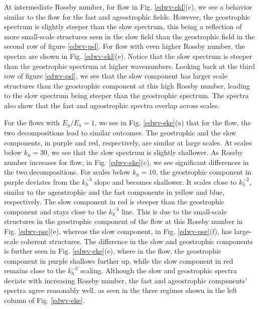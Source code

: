 \documentclass[../Rajarshi-thesis-draft.tex]{subfiles}
\begin{document}
At intermediate Rossby number, for \ire flow in Fig. \ref{edwv-ekl}(c), we see a behavior similar to the \lre flow for the fast and ageostrophic fields. However, the geostrophic spectrum is slightly steeper than the slow spectrum, this being a reflection of more small-scale structures seen in the slow field than the geostrophic field in the second row of figure \ref{edwv-psl}. 
For \hre flow with even higher Rossby number, the spectra are shown in Fig. \ref{edwv-ekl}(e). Notice that the slow spectrum is steeper than the geostrophic spectrum at higher wavenumbers. Looking back at the third row of figure \ref{edwv-psl}, we see that the slow component has larger scale structures than the geostrophic component at this high Rossby number, leading to the slow spectrum being steeper than the geostrophic spectrum.  The spectra also show that the fast and ageostrophic spectra overlap across scales. 

For the flows with $E_g/E_a = 1$, we see in Fig. \ref{edwv-eke}(a) that for the \lro flow, the two decompositions lead to similar outcomes. The geostrophic and the slow components, in purple and red, respectively, are similar at large scales.  At scales below  $k_h = 30$, we see that the slow spectrum is slightly shallower. As Rossby number increases for \iro flow, in Fig. \ref{edwv-eke}(c), we see significant differences in the two decompositions. For scales below  $k_h = 10$, the geostrophic component in purple deviates from the $k_h^{-3}$ slope and becomes shallower. It scales close to $k_h^{-2}$, similar to the ageostrophic and the fast components in yellow and blue, respectively. The slow component in red is steeper than the geostrophic component and stays close to the $k_h^{-3}$ line. This is due to the small-scale structures in the geostrophic component of the flow at this Rossby number in Fig. \ref{edwv-pse}(e), whereas the slow component, in Fig. \ref{edwv-pse}(f), has large-scale coherent structures. The difference in the slow and geostrophic components is further seen in Fig. \ref{edwv-eke}(e), where in the \hro flow, the geostrophic component in purple shallows further up, while the slow component in red remains close to the $k_h^{-3}$ scaling. Although the slow and geostrophic spectra deviate with increasing Rossby number, the fast and ageostrophic components' spectra agree reasonably well, as seen in the three regimes shown in the left column of Fig. \ref{edwv-eke}. 
\end{document}

